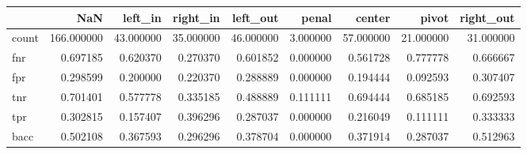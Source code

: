 \begin{tabular}{lrrrrrrrr}
\toprule
{} &         NaN &    left\_in &   right\_in &   left\_out &     penal &     center &      pivot &  right\_out \\
\midrule
count &  166.000000 &  43.000000 &  35.000000 &  46.000000 &  3.000000 &  57.000000 &  21.000000 &  31.000000 \\
fnr   &    0.697185 &   0.620370 &   0.270370 &   0.601852 &  0.000000 &   0.561728 &   0.777778 &   0.666667 \\
fpr   &    0.298599 &   0.200000 &   0.220370 &   0.288889 &  0.000000 &   0.194444 &   0.092593 &   0.307407 \\
tnr   &    0.701401 &   0.577778 &   0.335185 &   0.488889 &  0.111111 &   0.694444 &   0.685185 &   0.692593 \\
tpr   &    0.302815 &   0.157407 &   0.396296 &   0.287037 &  0.000000 &   0.216049 &   0.111111 &   0.333333 \\
bacc  &    0.502108 &   0.367593 &   0.296296 &   0.378704 &  0.000000 &   0.371914 &   0.287037 &   0.512963 \\
\bottomrule
\end{tabular}
